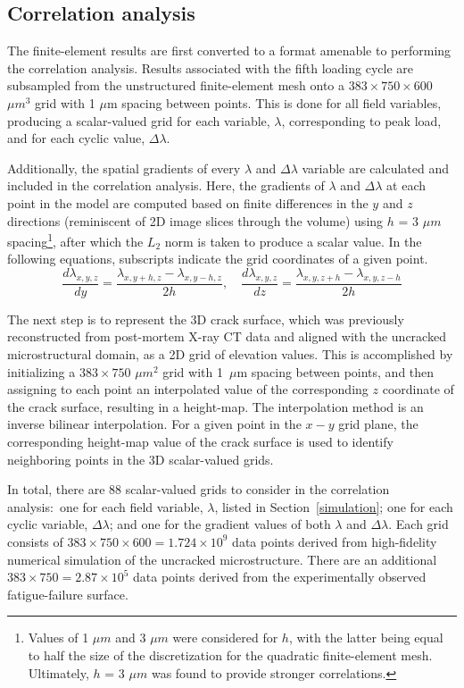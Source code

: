 \subsection{Correlation analysis}\label{correlation_analysis}
The finite-element results are first converted to a format amenable to performing the correlation analysis. Results associated with the fifth loading cycle are subsampled from the unstructured finite-element mesh onto a $383 \times 750 \times 600$ $\mu m^3$ grid with 1 $\mu$m spacing between points. This is done for all field variables, producing a scalar-valued grid for each variable, $\lambda$, corresponding to peak load, and for each cyclic value, $\Delta\lambda$.

Additionally, the spatial gradients of every $\lambda$ and $\Delta\lambda$ variable are calculated and included in the correlation analysis. Here, the gradients of $\lambda$ and $\Delta\lambda$ at each point in the model are computed based on finite differences in the $y$ and $z$ directions (reminiscent of 2D image slices through the volume) using $h$ = 3 $\mu m$ spacing\footnote{Values of 1 $\mu m$ and 3 $\mu m$ were considered for $h$, with the latter being equal to half the size of the discretization for the quadratic finite-element mesh. Ultimately, $h$ = 3 $\mu m$ was found to provide stronger correlations.}, after which the $L_2$ norm is taken to produce a scalar value. In the following equations, subscripts indicate the grid coordinates of a given point.
\begin{equation}
\frac{d\lambda_{x, y, z}}{dy} = \frac{\lambda_{x, y+h, z} - \lambda_{x, y-h, z}}{2h}, \quad 
\frac{d\lambda_{x, y, z}}{dz} = \frac{\lambda_{x, y, z+h} - \lambda_{x, y, z-h}}{2h}  \end{equation}

The next step is to represent the 3D crack surface, which was previously reconstructed from post-mortem X-ray CT data and aligned with the uncracked microstructural domain, as a 2D grid of elevation values. This is accomplished by initializing a $383 \times 750$ $\mu m^2$ grid with 1~$\mu$m spacing between points, and then assigning to each point an interpolated value of the corresponding $z$ coordinate of the crack surface, resulting in a height-map. The interpolation method is an inverse bilinear interpolation. For a given point in the $x-y$ grid plane, the corresponding height-map value of the crack surface is used to identify neighboring points in the 3D scalar-valued grids. 

In total, there are 88 scalar-valued grids to consider in the correlation analysis:~one for each field variable, $\lambda$, listed in Section~\ref{simulation}; one for each cyclic variable, $\Delta \lambda$; and one for the gradient values of both $\lambda$ and $\Delta \lambda$. Each grid consists of $383 \times 750 \times 600 = 1.724\times 10^{9}$ data points derived from high-fidelity numerical simulation of the uncracked microstructure. There are an additional $383 \times 750 = 2.87\times 10^{5}$ data points derived from the experimentally observed fatigue-failure surface.

